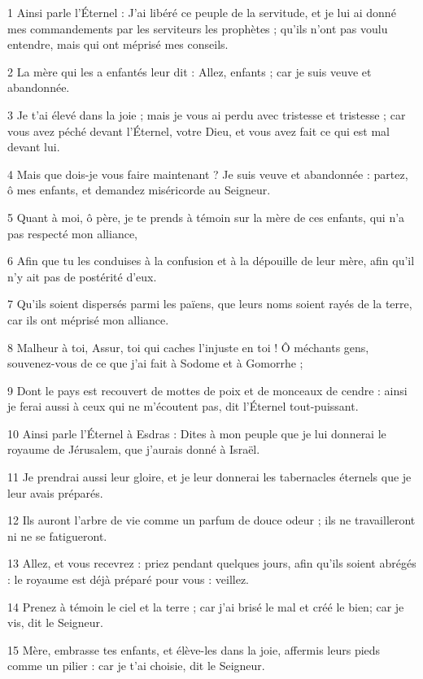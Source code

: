 \par 1 Ainsi parle l'Éternel : J'ai libéré ce peuple de la servitude, et je lui ai donné mes commandements par les serviteurs les prophètes ; qu'ils n'ont pas voulu entendre, mais qui ont méprisé mes conseils.
\par 2 La mère qui les a enfantés leur dit : Allez, enfants ; car je suis veuve et abandonnée.
\par 3 Je t'ai élevé dans la joie ; mais je vous ai perdu avec tristesse et tristesse ; car vous avez péché devant l'Éternel, votre Dieu, et vous avez fait ce qui est mal devant lui.
\par 4 Mais que dois-je vous faire maintenant ? Je suis veuve et abandonnée : partez, ô mes enfants, et demandez miséricorde au Seigneur.
\par 5 Quant à moi, ô père, je te prends à témoin sur la mère de ces enfants, qui n'a pas respecté mon alliance,
\par 6 Afin que tu les conduises à la confusion et à la dépouille de leur mère, afin qu'il n'y ait pas de postérité d'eux.
\par 7 Qu'ils soient dispersés parmi les païens, que leurs noms soient rayés de la terre, car ils ont méprisé mon alliance.
\par 8 Malheur à toi, Assur, toi qui caches l'injuste en toi ! Ô méchants gens, souvenez-vous de ce que j'ai fait à Sodome et à Gomorrhe ;
\par 9 Dont le pays est recouvert de mottes de poix et de monceaux de cendre : ainsi je ferai aussi à ceux qui ne m'écoutent pas, dit l'Éternel tout-puissant.
\par 10 Ainsi parle l'Éternel à Esdras : Dites à mon peuple que je lui donnerai le royaume de Jérusalem, que j'aurais donné à Israël.
\par 11 Je prendrai aussi leur gloire, et je leur donnerai les tabernacles éternels que je leur avais préparés.
\par 12 Ils auront l'arbre de vie comme un parfum de douce odeur ; ils ne travailleront ni ne se fatigueront.
\par 13 Allez, et vous recevrez : priez pendant quelques jours, afin qu'ils soient abrégés : le royaume est déjà préparé pour vous : veillez.
\par 14 Prenez à témoin le ciel et la terre ; car j'ai brisé le mal et créé le bien; car je vis, dit le Seigneur.
\par 15 Mère, embrasse tes enfants, et élève-les dans la joie, affermis leurs pieds comme un pilier : car je t'ai choisie, dit le Seigneur.

